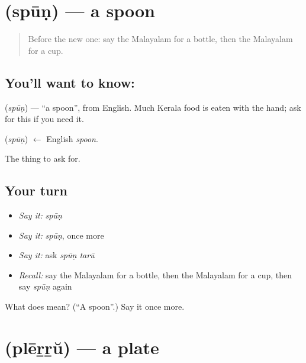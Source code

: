 \section[\texorpdfstring{\ml{സ്പൂൺ} (spūṇ)}{സ്പൂൺ (spūṇ)}]{ (spūṇ) — a spoon}

\label{lesson:ML-C134-spoon}



\begin{quote}
Before the new one: say the Malayalam for a bottle, then the Malayalam for a cup.
\end{quote}

\subsection*{You'll want to know: }
\textbf{} (\emph{spūṇ}) — \textquotedblleft{}a spoon\textquotedblright{}, from English. Much Kerala food is eaten with the hand; ask for this if you need it.

\begin{cousinweb}
\textbf{} (\emph{spūṇ}) $\leftarrow$ English \emph{spoon}.
\end{cousinweb}

\begin{grammarlens}[title={What you've built}]
The thing to ask for.
\end{grammarlens}

\subsection*{Your turn}
\begin{itemize}
\raggedright
  \item \emph{Say it:} \emph{spūṇ}
  \item \emph{Say it:} \emph{spūṇ}, once more
  \item \emph{Say it:} ask \emph{spūṇ tarū}
  \item \emph{Recall:} say the Malayalam for a bottle, then the Malayalam for a cup, then say \emph{spūṇ} again
\end{itemize}

\begin{tcolorbox}[breakable,colback=teal!4,colframe=teal!35!black,title={Before you move on}]
What does  mean? (\textquotedblleft{}A spoon\textquotedblright{}.) Say it once more.
\end{tcolorbox}
\section[\texorpdfstring{\ml{പ്ലേറ്റ്} (plēṟṟŭ)}{പ്ലേറ്റ് (plēṟṟŭ)}]{ (plēṟṟŭ) — a plate}

